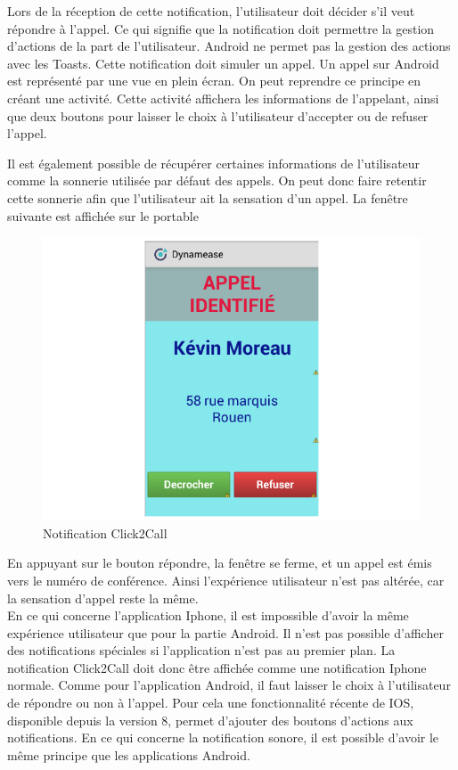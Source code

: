 Lors de la réception de cette notification, l'utilisateur doit décider s'il veut répondre à l'appel. Ce qui signifie que la notification doit permettre la gestion d'actions de la part de l'utilisateur. Android ne permet pas la gestion des actions avec les Toasts. Cette notification doit simuler un appel. Un appel sur Android est représenté par une vue en plein écran. On peut reprendre ce principe en créant une activité. Cette activité affichera les informations de l'appelant, ainsi que deux boutons pour laisser le choix à l'utilisateur d'accepter ou de refuser l'appel.

Il est également possible de récupérer certaines informations de l'utilisateur comme la sonnerie utilisée par défaut des appels. On peut donc faire retentir cette sonnerie afin que l'utilisateur ait la sensation d'un appel. La fenêtre suivante est affichée sur le portable

\begin{figure}[!h]
	\centering
	\includegraphics[scale=0.7]{img/click2call.png}
	\caption{\label{notification_click2call}Notification Click2Call}
\end{figure}


En appuyant sur le bouton répondre, la fenêtre se ferme, et un appel est émis vers le numéro de conférence. Ainsi l'expérience utilisateur n'est pas altérée, car la sensation d'appel reste la même.\\

En ce qui concerne l'application Iphone, il est impossible d'avoir la même expérience utilisateur que pour la partie Android. Il n'est pas possible d'afficher des notifications spéciales si l'application n'est pas au premier plan. La notification Click2Call doit donc être affichée comme une notification Iphone normale. Comme pour l'application Android, il faut laisser le choix à l'utilisateur de répondre ou non à l'appel. Pour cela une fonctionnalité récente de IOS, disponible depuis la version 8, permet d'ajouter des boutons d'actions aux notifications. En ce qui concerne la notification sonore, il est possible d'avoir le même principe que les applications Android.


